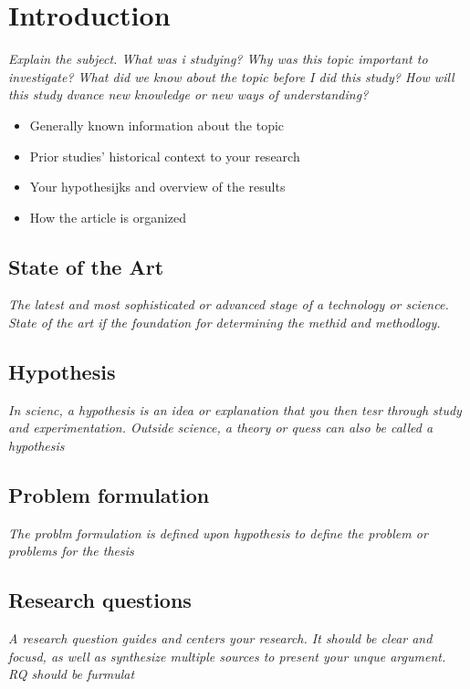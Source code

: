 
\section{Introduction}
\textit{Explain the subject. What was i studying? Why was this topic important to investigate? What did we know about the topic before I did this study? How will this study dvance new knowledge or new ways of understanding?}
\begin{itemize}
    \item Generally known information about the topic
    \item Prior studies' historical context to your research
    \item Your hypothesijks and overview of the results
    \item How the article is organized
\end{itemize}
\subsection{State of the Art}
\textit{The latest and most sophisticated or advanced stage of a technology or science. State of the art if the foundation for determining the methid and methodlogy.}
\subsection{Hypothesis}
\textit{In scienc, a hypothesis is an idea or explanation that you then tesr through study and experimentation. Outside science, a theory or quess can also be called a hypothesis}
\subsection{Problem formulation}
\textit{The problm formulation is defined upon hypothesis to define the problem or problems for the thesis}
\subsection{Research questions}
\textit{A research question guides and centers your research. It should be clear and focusd, as well as synthesize multiple sources to present your unque argument. RQ should be furmulat}
